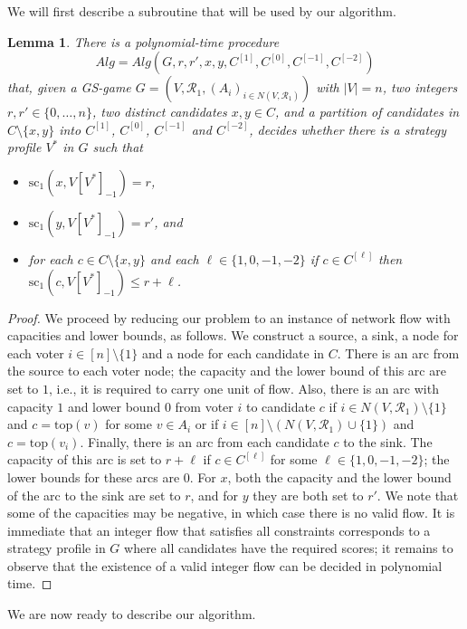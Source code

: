 \documentclass[11pt]{article}
\newtheorem{lemma}[theorem]{Lemma}
\newcommand{\calR}{\mathcal{R}}
\newcommand{\calA}{\mathit{Alg}}
\newcommand{\tp}{\mathrm{top}}
\newcommand{\scr}{\mathrm{sc}}
\begin{document}
We will first describe a subroutine that will be used by our algorithm.
\begin{lemma}\label{lem:plur-flow}
There is a polynomial-time procedure 
$$
\calA=\calA(G, r, r', x, y, C^{[1]}, C^{[0]}, C^{[-1]}, C^{[-2]})
$$ 
that, 
given a GS-game $G=(V, \calR_1, (A_i)_{i\in N(V, \calR_1)})$ with $|V|=n$, 
two integers $r, r'\in\{0, \dots, n\}$, two distinct candidates $x, y\in C$,
and a partition of candidates in $C\setminus\{x, y\}$ into $C^{[1]}$, $C^{[0]}$, $C^{[-1]}$ and $C^{[-2]}$,  
decides whether there is a strategy profile $V^*$ in $G$ such that 
\begin{itemize}
\item
$\scr_1(x, V[V^*]_{-1})=r$,
\item
$\scr_1(y, V[V^*]_{-1})=r'$, and
\item
for each $c\in C\setminus\{x, y\}$ and each $\ell\in\{1, 0, -1, -2\}$
if $c\in C^{[\ell]}$ then 
$\scr_1(c, V[V^*]_{-1})\le r+\ell$.
\end{itemize}
\end{lemma}
\begin{proof}
We proceed by reducing our problem to an instance of network flow with capacities and lower bounds, as follows.
We construct a source, a sink, a node for each voter $i\in[n]\setminus\{1\}$ and a node 
for each candidate in $C$. There is an arc from the source to each voter node; the capacity and the lower
bound of this arc are set to $1$, i.e., it is required to carry one unit of flow.
Also, there is an arc with capacity $1$ and lower bound 0 from voter $i$ to candidate $c$ if 
$i\in N(V, \calR_1)\setminus\{1\}$ and $c=\tp(v)$ for some $v\in A_i$ or if $i\in [n]\setminus(N(V, \calR_1)\cup\{1\})$ 
and $c=\tp(v_i)$. Finally, there is an arc from each candidate $c$ to the sink. The capacity of this arc
is set to $r+\ell$ if $c\in C^{[\ell]}$ for some $\ell\in\{1, 0, -1, -2\}$;
the lower bounds for these arcs are $0$. For $x$, 
both the capacity and the lower bound of the arc to the sink are set to $r$, and for $y$
they are both set to $r'$. 
We note that some of the capacities may be negative, in which case there is no valid flow.
It is immediate that an integer flow that satisfies all constraints
corresponds to a strategy profile in $G$ where all candidates have the required scores;
it remains to observe that the existence of a valid integer flow  
can be decided in polynomial time.
\end{proof}

We are now ready to describe our algorithm.
\end{document}
